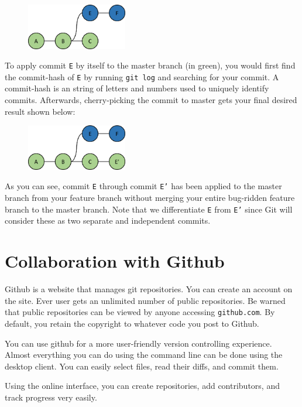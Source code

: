 \documentclass[12pt]{report}
\newcommand\code[1]{{\color{blue}\texttt{#1}}}
\begin{document}
\begin{figure}[h]
\center
\includegraphics[height=2cm]{feature}
\end{figure}

To apply commit \texttt{E} by itself to the master branch (in green), you would first find the commit-hash of \texttt{E} by running \code{git log} and searching for your commit.  A commit-hash is an string of letters and numbers used to uniquely identify commits.  Afterwards, cherry-picking the commit to master gets your final desired result shown below:

\begin{figure}[h]
\center
\includegraphics[height=2cm]{cherrypick}
\end{figure}

As you can see, commit \texttt{E} through commit \texttt{E'} has been applied to the master branch from your feature branch without merging your entire bug-ridden feature branch to the master branch.  Note that we differentiate \texttt{E} from \texttt{E'} since Git will consider these as two separate and independent commits.

\section{Collaboration with Github}

Github is a website that manages git repositories. You can create an account on the site. Ever user gets an unlimited number of public repositories. Be warned that public repositories can be viewed by anyone accessing \code{github.com}. By default, you retain the copyright to whatever code you post to Github.

You can use github for a more user-friendly version controlling experience.  Almost everything you can do using the command line can be done using the desktop client.  You can easily select files, read their diffs, and commit them.
 
Using the online interface, you can create repositories, add contributors, and track progress very easily.
\end{document}
